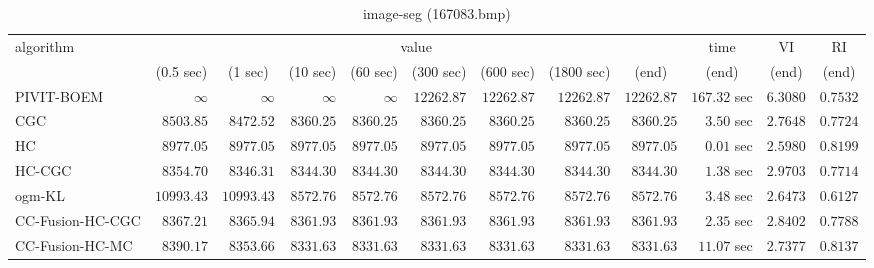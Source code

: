 \begin{table}[H]
\scriptsize
\centering
\caption{image-seg (167083.bmp)}
\label{tab:anytimetable-image-seg-167083.bmp}
\begin{tabular}{lrrrrrrrrrrr}
\toprule
           algorithm &                                   \multicolumn{8}{c}{value} & \multicolumn{1}{c}{time}    & \multicolumn{1}{c}{VI}  & \multicolumn{1}{c}{RI} \\  
\cmidrule(lr){2-9}\cmidrule(lr){10-10} \cmidrule(lr){11-11} \cmidrule(lr){12-12}   
                     & \multicolumn{1}{c}{(0.5 sec)} & \multicolumn{1}{c}{(1 sec)} & \multicolumn{1}{c}{(10 sec)} & \multicolumn{1}{c}{(60 sec)} & \multicolumn{1}{c}{(300 sec)} & \multicolumn{1}{c}{(600 sec)} & \multicolumn{1}{c}{(1800 sec)} & \multicolumn{1}{c}{(end)} & \multicolumn{1}{c}{(end)}    & \multicolumn{1}{c}{(end)}   & \multicolumn{1}{c}{(end)}  \\ \midrule 
          PIVIT-BOEM & $\infty$ & $\infty$ & $\infty$ & $\infty$ & $     12262.87$ & $     12262.87$ & $     12262.87$ & $     12262.87$ & $       167.32$ sec    & $       6.3080$  & $       0.7532$ \\ 
                 CGC & $      8503.85$ & $      8472.52$ & $      8360.25$ & $      8360.25$ & $      8360.25$ & $      8360.25$ & $      8360.25$ & $      8360.25$ & $         3.50$ sec    & $       2.7648$  & $       0.7724$ \\ 
                  HC & $      8977.05$ & $      8977.05$ & $      8977.05$ & $      8977.05$ & $      8977.05$ & $      8977.05$ & $      8977.05$ & $      8977.05$ & $         0.01$ sec    & $       2.5980$  & $       0.8199$ \\ 
              HC-CGC & $      8354.70$ & $      8346.31$ & $      8344.30$ & $      8344.30$ & $      8344.30$ & $      8344.30$ & $      8344.30$ & $      8344.30$ & $         1.38$ sec    & $       2.9703$  & $       0.7714$ \\ 
              ogm-KL & $     10993.43$ & $     10993.43$ & $      8572.76$ & $      8572.76$ & $      8572.76$ & $      8572.76$ & $      8572.76$ & $      8572.76$ & $         3.48$ sec    & $       2.6473$  & $       0.6127$ \\ 
    CC-Fusion-HC-CGC & $      8367.21$ & $      8365.94$ & $      8361.93$ & $      8361.93$ & $      8361.93$ & $      8361.93$ & $      8361.93$ & $      8361.93$ & $         2.35$ sec    & $       2.8402$  & $       0.7788$ \\ 
     CC-Fusion-HC-MC & $      8390.17$ & $      8353.66$ & $      8331.63$ & $      8331.63$ & $      8331.63$ & $      8331.63$ & $      8331.63$ & $      8331.63$ & $        11.07$ sec    & $       2.7377$  & $       0.8137$ \\ 

\end{tabular}
\end{table}
